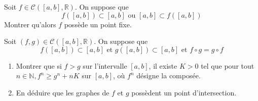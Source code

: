 \documentclass[titlepage, twoside]{report}
\begin{document}
\begin{tcolorbox}[title=Exercice 2, title filled=false, colframe=darkgreen, colback=darkgreen!10!white]
    Soit $f \in \mathcal{C}([a, b], \mathbb{R})$. On suppose que
    $$f([a, b]) \subset [a, b] \text{ ou } [a, b] \subset f([a, b])$$
    Montrer qu'alors $f$ possède un point fixe. 
\end{tcolorbox}

\begin{tcolorbox}[title=Exercice 3, title filled=false, colframe=darkgreen, colback=darkgreen!10!white]
    Soit $(f, g) \in \mathcal{C}([a, b], \mathbb{R})$. On suppose que
    $$f([a, b]) \subset [a, b] \text{ et } g([a, b]) \subset [a, b] \text{ et } f \circ g = g \circ f$$
    \begin{enumerate}
        \item Montrer que si $f > g$ sur l'intervalle $[a, b]$, il existe $K > 0$ tel que pour tout $n \in \mathbb{N}, f^n \geq g^n + nK$ sur $[a, b]$, où $f^n$ désigne la composée. 
        \item En déduire que les graphes de $f$ et $g$ possèdent un point d'intersection. 
    \end{enumerate}
\end{tcolorbox}
\end{document}
